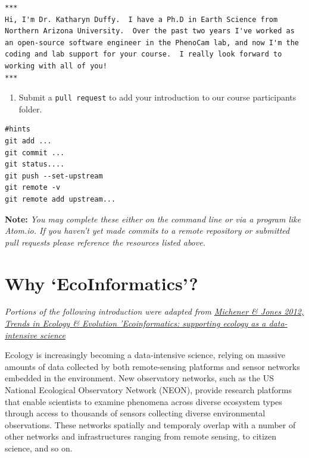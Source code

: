 \documentclass[
  letterpaper,
]{book}
\providecommand{\tightlist}{%
  \setlength{\itemsep}{0pt}\setlength{\parskip}{0pt}}
\begin{document}
\begin{verbatim}
***
Hi, I'm Dr. Katharyn Duffy.  I have a Ph.D in Earth Science from Northern Arizona University.  Over the past two years I've worked as an open-source software engineer in the PhenoCam lab, and now I'm the coding and lab support for your course.  I really look forward to working with all of you!
***
\end{verbatim}

\begin{enumerate}
\def\labelenumi{\arabic{enumi}.}
\setcounter{enumi}{4}
\tightlist
\item
  Submit a \texttt{pull\ request} to add your introduction to our course
  participants folder.
\end{enumerate}

\begin{verbatim}
#hints
git add ...
git commit ...
git status....
git push --set-upstream
git remote -v
git remote add upstream...
\end{verbatim}

\textbf{Note:} \emph{You may complete these either on the command line
or via a program like Atom.io. If you haven't yet made commits to a
remote repository or submitted pull requests please reference the
resources listed above.}


\chapter*{Why `EcoInformatics'?}\label{why-ecoinformatics}


\emph{Portions of the following introduction were adapted from
\href{https://www.cell.com/trends/ecology-evolution/fulltext/S0169-5347(11)00339-9}{Michener
\& Jones 2012, Trends in Ecology \& Evolution 'Ecoinformatics:
supporting ecology as a data-intensive science}}

Ecology is increasingly becoming a data-intensive science, relying on
massive amounts of data collected by both remote-sensing platforms and
sensor networks embedded in the environment. New observatory networks,
such as the US National Ecological Observatory Network (NEON), provide
research platforms that enable scientists to examine phenomena across
diverse ecosystem types through access to thousands of sensors
collecting diverse environmental observations. These networks spatially
and temporaly overlap with a number of other networks and
infrastructures ranging from remote sensing, to citizen science, and so
on.
\end{document}
